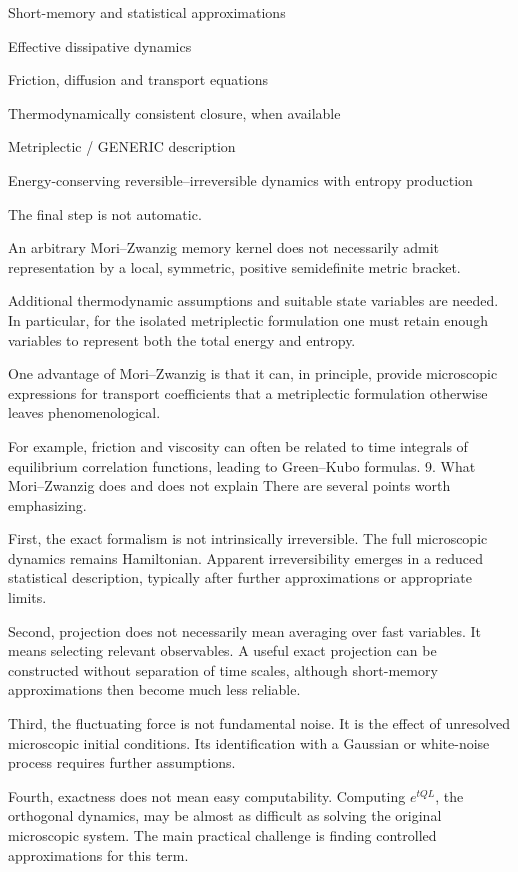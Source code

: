 Short-memory and statistical approximations

Effective dissipative dynamics

Friction, diffusion and transport equations

Thermodynamically consistent closure, when available

Metriplectic / GENERIC description

Energy-conserving reversible–irreversible dynamics with entropy production


The final step is not automatic.

An arbitrary Mori–Zwanzig memory kernel does not necessarily admit representation by a local, symmetric, positive semidefinite metric bracket.

Additional thermodynamic assumptions and suitable state variables are needed. In particular, for the isolated metriplectic formulation one must retain enough variables to represent both the total energy and entropy.

One advantage of Mori–Zwanzig is that it can, in principle, provide microscopic expressions for transport coefficients that a metriplectic formulation otherwise leaves phenomenological.

For example, friction and viscosity can often be related to time integrals of equilibrium correlation functions, leading to Green–Kubo formulas.
9. What Mori–Zwanzig does and does not explain
There are several points worth emphasizing.

First, the exact formalism is not intrinsically irreversible. The full microscopic dynamics remains Hamiltonian. Apparent irreversibility emerges in a reduced statistical description, typically after further approximations or appropriate limits.

Second, projection does not necessarily mean averaging over fast variables. It means selecting relevant observables. A useful exact projection can be constructed without separation of time scales, although short-memory approximations then become much less reliable.

Third, the fluctuating force is not fundamental noise. It is the effect of unresolved microscopic initial conditions. Its identification with a Gaussian or white-noise process requires further assumptions.

Fourth, exactness does not mean easy computability. Computing \(e^{tQL}\), the orthogonal dynamics, may be almost as difficult as solving the original microscopic system. The main practical challenge is finding controlled approximations for this term.

